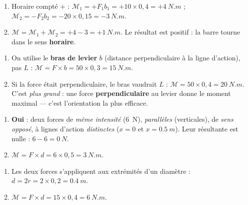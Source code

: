 \documentclass[11pt,a4paper]{article}
\begin{document}
\begin{corrige}
\begin{enumerate}[label=\alph*)]
  \item Horaire compté $+$ : $\mathcal{M}_1 = +F_1 b_1 = +10\times 0{,}4 = +\qty{4}{N.m}$ ;
        $\mathcal{M}_2 = -F_2 b_2 = -20\times 0{,}15 = -\qty{3}{N.m}$.
  \item $\mathcal{M} = \mathcal{M}_1+\mathcal{M}_2 = +4-3 = +\qty{1}{N.m}$. Le résultat est positif : la
        barre tourne dans le sens \textbf{horaire}.
\end{enumerate}
\end{corrige}

\begin{corrige}
\begin{enumerate}[label=\alph*)]
  \item On utilise le \textbf{bras de levier} $b$ (distance perpendiculaire à la ligne d'action), pas $L$ :
        $\mathcal{M} = F\times b = 50\times 0{,}3 = \qty{15}{N.m}$.
  \item Si la force était perpendiculaire, le bras vaudrait $L$ : $\mathcal{M}=50\times 0{,}4=\qty{20}{N.m}$.
        C'est \emph{plus grand} : une force \textbf{perpendiculaire} au levier donne le moment maximal —
        c'est l'orientation la plus efficace.
\end{enumerate}
\end{corrige}

\begin{corrige}
\begin{enumerate}[label=\alph*)]
  \item \textbf{Oui} : deux forces de \emph{même intensité} (\qty{6}{N}), \emph{parallèles} (verticales),
        de \emph{sens opposé}, à lignes d'action \emph{distinctes} ($x=0$ et $x=\qty{0.5}{m}$). Leur
        résultante est nulle : $6-6=\qty{0}{N}$.
  \item $\mathcal{M} = F\times d = 6\times 0{,}5 = \qty{3}{N.m}$.
\end{enumerate}
\end{corrige}

\begin{corrige}[le volant]
\begin{enumerate}[label=\alph*)]
  \item Les deux forces s'appliquent aux extrémités d'un diamètre : $d = 2r = 2\times 0{,}2 = \qty{0.4}{m}$.
  \item $\mathcal{M} = F\times d = 15\times 0{,}4 = \qty{6}{N.m}$.
\end{enumerate}
\end{corrige}
\end{document}
